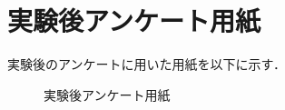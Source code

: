 \documentclass[a4paper,11pt]{jreport}
\begin{document}





\newpage

\renewcommand{\bibname}{参考文献}









\appendix{}
\chapter{実験後アンケート用紙}
実験後のアンケートに用いた用紙を以下に示す．
\begin{figure}[htbp]
 \begin{center}
 \end{center}
 \caption{実験後アンケート用紙}
 \label{fig:one}
\end{figure}
\end{document}
